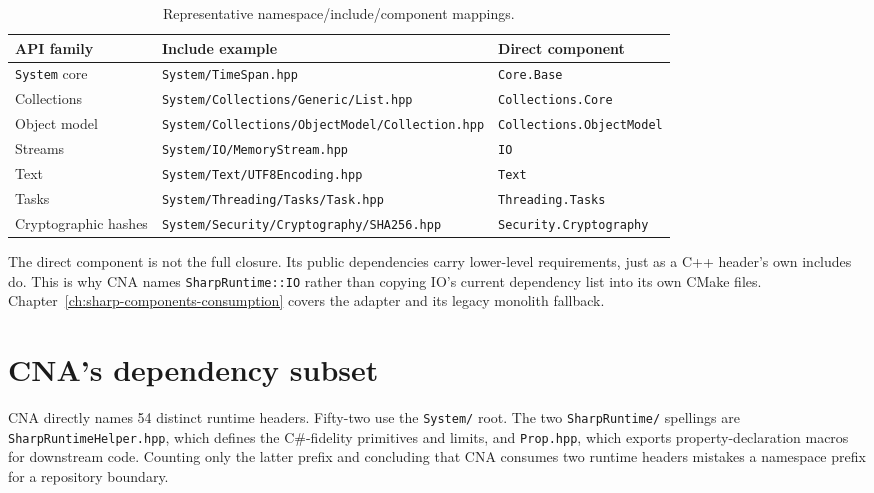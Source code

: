 \begin{table}[htbp]
  \centering
  \small
  \caption{Representative namespace/include/component mappings.}
  \label{tab:sharp-namespace-components}
  \begin{tabular}{@{}p{}p{}p{}@{}}
    \toprule
    API family & Include example & Direct component \\
    \midrule
    \texttt{System} core & \texttt{System/TimeSpan.hpp} & \texttt{Core.Base} \\
    Collections & \texttt{System/Collections/}\newline\texttt{Generic/List.hpp} & \texttt{Collections.Core} \\
    Object model & \texttt{System/Collections/}\newline\texttt{ObjectModel/Collection.hpp} & \texttt{Collections.}\newline\texttt{ObjectModel} \\
    Streams & \texttt{System/IO/MemoryStream.hpp} & \texttt{IO} \\
    Text & \texttt{System/Text/UTF8Encoding.hpp} & \texttt{Text} \\
    Tasks & \texttt{System/Threading/Tasks/Task.hpp} & \texttt{Threading.Tasks} \\
    Cryptographic hashes & \texttt{System/Security/}\newline\texttt{Cryptography/SHA256.hpp} & \texttt{Security.}\newline\texttt{Cryptography} \\
    \bottomrule
  \end{tabular}
\end{table}

The direct component is not the full closure. Its public dependencies carry lower-level
requirements, just as a C++ header's own includes do. This is why CNA names
\texttt{SharpRuntime::IO} rather than copying IO's current dependency list into its own CMake
files. Chapter~\ref{ch:sharp-components-consumption} covers the adapter and its legacy
monolith fallback.

\section{CNA's dependency subset}

CNA directly names 54 distinct runtime headers. Fifty-two use the \texttt{System/} root. The
two \texttt{SharpRuntime/} spellings are \texttt{SharpRuntimeHelper.hpp}, which defines the
C\#-fidelity primitives and limits, and \texttt{Prop.hpp}, which exports property-declaration
macros for downstream code. Counting only the latter prefix and concluding that CNA consumes
two runtime headers mistakes a namespace prefix for a repository boundary.

